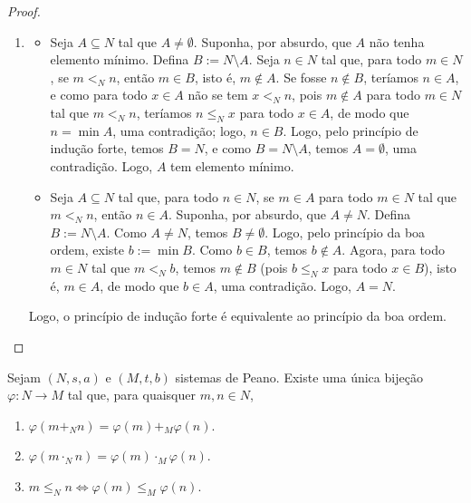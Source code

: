 \begin{proof}
\begin{enumerate}[leftmargin=*, align=left, label=\textbf{(\alph*)}]
            \item 
                \begin{itemize}
                    \item[($\Rightarrow$)] Seja $A \subseteq N$ tal que $A \neq \emptyset$. Suponha, por absurdo, que $A$ não tenha elemento mínimo. Defina $B:= N \setminus A$. Seja $n \in N$ tal que, para todo $m \in N$, se $m <_N n$, então $m \in B$, isto é, $m \notin A$. Se fosse $n \notin B$, teríamos $n \in A$, e como para todo $x \in A$ não se tem $x <_N n$, pois $m \notin A$ para todo $m \in N$ tal que $m <_N n$, teríamos $n \leq_N x$ para todo $x \in A$, de modo que $n = \min A$, uma contradição; logo, $n \in B$. Logo, pelo princípio de indução forte, temos $B = N$, e como $B = N \setminus A$, temos $A = \emptyset$, uma contradição. Logo, $A$ tem elemento mínimo.
                    \item[($\Leftarrow$)] Seja $A \subseteq N$ tal que, para todo $n \in N$, se $m \in A$ para todo $m \in N$ tal que $m <_N n$, então $n \in A$. Suponha, por absurdo, que $A \neq N$. Defina $B := N \setminus A$. Como $A \neq N$, temos $B \neq \emptyset$. Logo, pelo princípio da boa ordem, existe $b := \min B$. Como $b \in B$, temos $b \notin A$. Agora, para todo $m \in N$ tal que $m <_N b$, temos $m \notin B$ (pois $b \leq_N x$ para todo $x \in B$), isto é, $m \in A$, de modo que $b \in A$, uma contradição. Logo, $A = N$.
                \end{itemize}
            Logo, o princípio de indução forte é equivalente ao princípio da boa ordem. \blackproof
        \end{enumerate}
\end{proof}

\begin{theorem} \label{teo.set:isomorfismo_sistemas_peano_soma_produto_ordem}
    Sejam $(N,s,a)$ e $(M,t,b)$ sistemas de Peano. Existe uma única bijeção $\varphi : N \to M$ tal que, para quaisquer $m,n \in N$,
        \begin{enumerate}[label=\roman*.]
            \item $\varphi(m +_N n) = \varphi(m) +_M \varphi(n)$.
            \item $\varphi(m \cdot_N n) = \varphi(m) \cdot_M \varphi(n)$.
            \item $m \leq_N n \Leftrightarrow \varphi(m) \leq_M \varphi(n)$.
        \end{enumerate}
\end{theorem}

